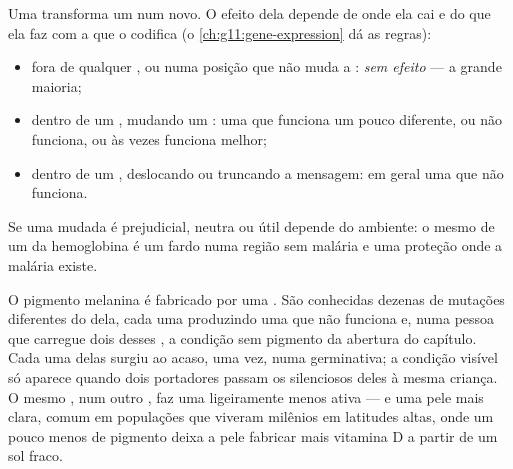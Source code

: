 \begin{proposition}\label{prop:g11:mutations:consequences}
Uma  transforma um  num  novo. O efeito dela depende
de onde ela cai e do que ela faz com a  que o  codifica (o
\cref{ch:g11:gene-expression} dá as regras):
\begin{itemize}
  \item fora de qualquer , ou numa posição que não muda a
        : \emph{sem efeito} --- a grande maioria;
  \item dentro de um , mudando um : uma  que
        funciona um pouco diferente, ou não funciona, ou às vezes
        funciona melhor;
  \item dentro de um , deslocando ou truncando a mensagem: em
        geral uma  que não funciona.
\end{itemize}
Se uma  mudada é prejudicial, neutra ou útil depende do
ambiente: o mesmo  de um  da hemoglobina é um fardo numa
região sem malária e uma proteção onde a malária existe.
\end{proposition}
\admitted

\begin{example}\label{ex:g11:mutations:pigment}
O pigmento melanina é fabricado por uma . São conhecidas dezenas
de mutações diferentes do  dela, cada uma produzindo uma  que
não funciona e, numa pessoa que carregue dois desses , a
condição sem pigmento da abertura do capítulo. Cada uma delas surgiu ao
acaso, uma vez, numa  germinativa; a condição visível só aparece
quando dois portadores passam os  silenciosos deles à mesma
criança. O mesmo , num outro , faz uma  ligeiramente
menos ativa --- e uma pele mais clara, comum em populações que viveram
milênios em latitudes altas, onde um pouco menos de pigmento deixa a
pele fabricar mais vitamina D a partir de um sol fraco.
\end{example}


